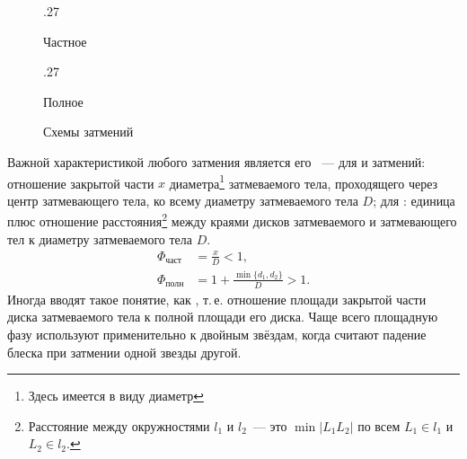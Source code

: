 \begin{wrapfigure}[15]{r}{.27\tw}
    \centering
    \vspace{-1pc}
    \begin{subcaptionblock}[t]{.27\tw}
        \centering
        
        \caption{Частное}
        \label{pic:partial-esclipse-phase}
    \end{subcaptionblock}
    \begin{subcaptionblock}[t]{.27\tw}
        \centering
        
        \caption{Полное}
        \label{pic:full-esclipse-phase}
    \end{subcaptionblock}
    \caption{Схемы затмений}
    \label{fig:part-eclipses-scheme}
\end{wrapfigure}
Важной характеристикой любого затмения является его ~--- для  и  затмений: отношение закрытой части $x$ диаметра\footnote{Здесь имеется в виду  диаметр} затмеваемого тела, проходящего через центр затмевающего тела, ко всему диаметру затмеваемого тела $D$; для : единица плюс отношение расстояния\footnote{Расстояние между окружностями $l_1$ и $l_2$~--- это $\min |L_1L_2|$ по всем $L_1 \in l_1$ и $L_2 \in l_2$.} между краями дисков затмеваемого и затмевающего тел к диаметру затмеваемого тела $D$.
\begin{align}
    \Phi_{\text{част}} &= \frac{x}{D}< 1,\\
    \Phi_{\text{полн}} &= 1 + \frac{\min\{d_1, d_2\}}{D}> 1.
\end{align}
Иногда вводят такое понятие, как , т.\,е. отношение площади закрытой части диска затмеваемого тела к полной площади его диска. Чаще всего площадную фазу используют применительно к двойным звёздам, когда считают падение блеска при затмении одной звезды другой.
